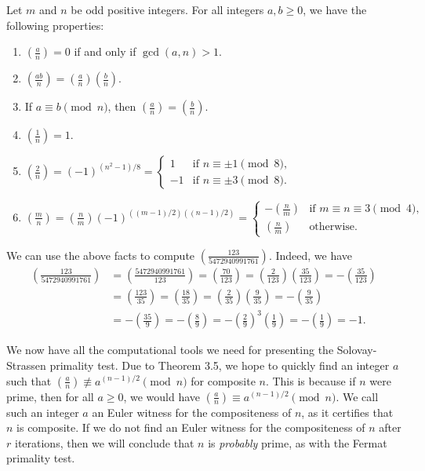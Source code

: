 \begin{prop}
Let $m$ and $n$ be odd positive integers. For all integers $a, b \geq 0$, we have the following properties:
\begin{enumerate}[(1)]
    \item $\left(\frac an\right) = 0$ if and only if $\gcd(a, n) > 1$. 
    \item $\left(\frac {ab}n\right) = \left(\frac an\right)\left(\frac bn\right)$. 
    \item If $a \equiv b \pmod n$, then $\left(\frac an\right) = \left(\frac bn\right)$. 
    \item $\left(\frac1n\right) = 1$. 
    \item $\left(\frac2n\right) = (-1)^{(n^2-1)/8} = \begin{cases} 1 & \text{if } n \equiv \pm1 \pmod 8, \\ -1 & \text{if } n \equiv \pm3 \pmod 8. \end{cases}$
    \item $\left(\frac mn\right) = \left(\frac nm\right) (-1)^{((m-1)/2)((n-1)/2)} = \begin{cases} -\left(\frac nm\right) & \text{if } m\equiv n \equiv 3 \pmod 4, \\ \left(\frac nm\right) & \text{otherwise.} \end{cases}$
\end{enumerate}
\end{prop}

\begin{exmp}
We can use the above facts to compute $\left(\frac{123}{5472940991761}\right)$. Indeed, we have 
\begin{align*}
    \left( \frac{123}{5472940991761} \right) &= 
    \left( \frac{5472940991761}{123} \right) = \left( \frac{70}{123} \right) 
    = \left( \frac{2}{123} \right) \left( \frac{35}{123} \right) = -\left( \frac{35}{123} \right) \\
    &= \left( \frac{123}{35} \right) = \left( \frac{18}{35} \right) = \left( \frac{2}{35} \right)
    \left( \frac{9}{35} \right) = -\left( \frac{9}{35} \right) \\
    &= -\left( \frac{35}{9} \right) = -\left( \frac{8}{9} \right) = -\left( \frac{2}{9} \right)^{\!3}
    \left( \frac{1}{9} \right) = -\left( \frac{1}{9} \right) = -1. 
\end{align*}
\end{exmp}

We now have all the computational tools we need for presenting the Solovay-Strassen primality test. 
Due to Theorem 3.5, we hope to quickly find an integer $a$ such that $\left(\frac an \right) 
\not\equiv a^{(n-1)/2} \pmod n$ for composite $n$. This is because if $n$ were prime, then
for all $a \geq 0$, we would have $\left( \frac an \right) \equiv a^{(n-1)/2} \pmod n$.
We call such an integer $a$ an Euler witness for 
the compositeness of $n$, as it certifies that $n$ is composite. If we do not find an Euler 
witness for the compositeness of $n$ after $r$ iterations, then we will conclude that 
$n$ is {\it probably} prime, as with the Fermat primality test. 

